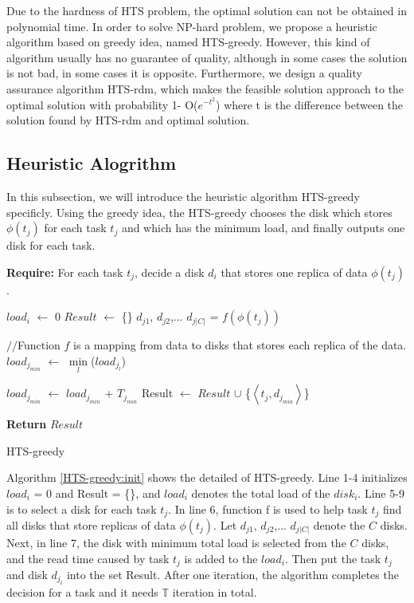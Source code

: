 \documentclass[conference]{IEEEtran}
\begin{document}
Due to the hardness of HTS problem, the optimal solution can not be obtained in polynomial time. In order to solve NP-hard problem, we propose a heuristic algorithm based on greedy idea, named HTS-greedy. However, this kind of algorithm usually has no guarantee of quality, although in some cases the solution is not bad, in some cases it is opposite. Furthermore, we design a quality assurance algorithm HTS-rdm, which makes the feasible solution approach to the optimal solution with probability 1- O($e^{-t^2}$) where t is the difference between the solution found by HTS-rdm and optimal solution.


\subsection{Heuristic Alogrithm}\label{Heuristic}

In this subsection, we will introduce the heuristic algorithm HTS-greedy specificly. Using the greedy idea, the HTS-greedy chooses the disk which stores $\phi(t_j)$ for each task $t_j$ and which has the minimum load, and finally outputs one disk for each task.


\begin{algorithm}

	\textbf{Require:} For each task $t_j$, decide a disk $d_i$ that stores one replica of data $\phi(t_j)$.

	\begin{algorithmic}[1]
		 \label{HTS-greedy:init}
			\State $load_{i}$ $\gets$ 0
		\EndFor
		\State $Result$ $\gets$ \{\}
			\State $d_{j1}$, $d_{j2}$,... $d_{j|C|}$ = $f(\phi(t_j))$
		
			$//$Function $f$ is a mapping from data to disks that stores each replica of the data.
			\State $load_{j_{min}}$ $\gets$ $\min\limits_{l}$($load_{j_l}$)
			
			$load_{j_{min}}$ $\gets$ $load_{j_{min}}$ + $T_{j_{min}}$
			\State Result $\gets$ $Result$ $\cup$
			\{$\left \langle t_j, d_{j_{min}}\right \rangle$\}
		\EndFor
	
	\State \textbf{Return} $Result$
	\end{algorithmic}
	\caption{HTS-greedy}\label{HTS-greedy}
\end{algorithm}

Algorithm \ref{HTS-greedy:init} shows the detailed of HTS-greedy. Line 1-4 initializes $load_i$ = 0 and Result = \{\}, and $load_i$ denotes the total load of the $disk_i$. Line 5-9 is to select a disk for each task $t_j$. In line 6, function f is used to help task $t_j$ find all disks that store replicas of data $\phi(t_j)$. Let $d_{j1}$, $d_{j2}$,... $d_{j|C|}$ denote the $C$ disks. Next, in line 7, the disk with minimum total load is selected from the $C$ disks, and the read time caused by task $t_j$ is added to the $load_i$. Then put the task $t_j$ and disk $d_{j_l}$ into the set Result. After one iteration, the algorithm completes the decision for a task and it needs $\mathbb{T}$ iteration in total.
\end{document}
